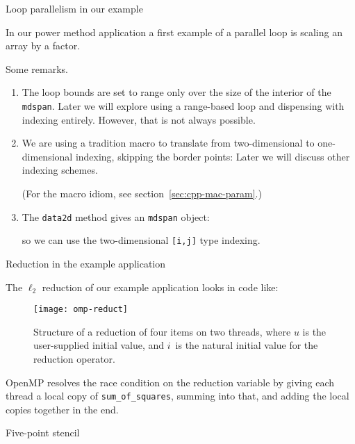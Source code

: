  {Loop parallelism in our example}
\label{sec:d2d-omp1d}

In our power method application
a first example of a parallel loop is scaling an array by a factor.
%

Some remarks.
\begin{enumerate}
\item
  The loop bounds are set to range only over the size of the interior
  of the \lstinline{mdspan}.
  Later we will explore using a range-based loop and
  dispensing with indexing entirely.
  However, that is not always possible.
\item We are using a tradition macro to translate from two-dimensional
  to one-dimensional indexing, skipping the border points:
  Later we will discuss other indexing schemes.
\begin{packt}
    (For the macro idiom, see section~\ref{sec:cpp-mac-param}.)
\end{packt}
\item
  The \lstinline{data2d} method gives an \lstinline{mdspan} object:
  

  so we can use the two-dimensional \lstinline{[i,j]} type indexing.
\end{enumerate}


 {Reduction in the example application}

The $\ell_2$ reduction of our example application
looks in code like:
%

\begin{figure}[t]
  \texttt{[image: omp-reduct]}
  \caption{Structure of a reduction of four items on two threads,
    where $u$ is the user-supplied initial value,
    and $i$~is the natural initial value for the reduction operator.}
  \label{fig:omp-reduct}
\end{figure}

OpenMP resolves the race condition on the reduction variable
by giving each thread a local copy of \lstinline{sum_of_squares},
summing into that, and adding the local copies together in the end.


 {Five-point stencil}
\label{sec:d2d-5pt}

